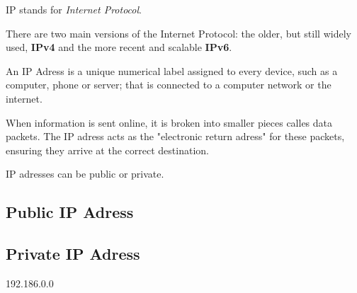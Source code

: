 IP stands for \emph{Internet Protocol}.

There are two main versions of the Internet Protocol: the older, but still widely used, \textbf{IPv4} and the more recent and scalable \textbf{IPv6}.

An IP Adress is a unique numerical label assigned to every device, such as a computer, phone or server; that is connected to a computer network or the internet.

When information is sent online, it is broken into smaller pieces calles data packets. The IP adress acts as the "electronic return adress" for these packets, ensuring they arrive at the correct destination.

IP adresses can be public or private.

\subsection{Public IP Adress}

\subsection{Private IP Adress}

192.186.0.0
